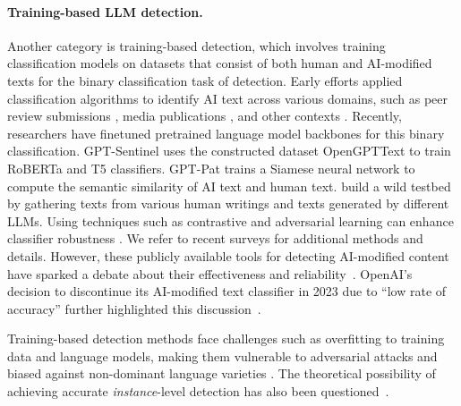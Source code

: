 \documentclass{article}
\begin{document}
\paragraph{Training-based LLM detection.} Another category is training-based detection, which involves training classification models on datasets that consist of both human and AI-modified texts for the binary classification task of detection. Early efforts applied classification algorithms to identify AI text across various domains, such as peer review submissions \citep{Bhagat2013SquibsWI}, media publications \citep{Zellers2019DefendingAN}, and other contexts \citep{Bakhtin2019RealOF, Uchendu2020AuthorshipAF}. Recently, researchers have finetuned pretrained language model backbones for this binary classification. GPT-Sentinel \citep{Chen2023GPTSentinelDH} uses the constructed dataset OpenGPTText to train RoBERTa \citep{Liu2019RoBERTaAR} and T5 \citep{raffel2020exploring} classifiers. GPT-Pat \citep{Yu2023GPTPT} trains a Siamese neural network to compute the semantic similarity of AI text and human text. \citet{Li2023DeepfakeTD} build a wild testbed by gathering texts from various human writings and texts generated by different LLMs. Using techniques such as contrastive and adversarial learning can enhance classifier robustness \citep{Liu2022CoCoCM, Bhattacharjee2023ConDACD, Hu2023RADARRA}. We refer to recent surveys \citet{Yang2023ASO, Ghosal2023TowardsP} for additional methods and details. However, these publicly available tools for detecting AI-modified content have sparked a debate about their effectiveness and reliability~\citep{OpenAIGPT2,jawahar2020automatic,fagni2021tweepfake,ippolito2019automatic,mitchell2023detectgpt,human-hard-to-detect-generated-text,mit-technology-review-how-to-spot-ai-generated-text,survey-2023, solaiman2019release}. OpenAI's decision to discontinue its AI-modified text classifier in 2023 due to ``low rate of accuracy'' further highlighted this discussion~\citep{Kirchner2023,Kelly2023}.

Training-based detection methods face challenges such as overfitting to training data and language models, making them vulnerable to adversarial attacks \citep{Wolff2020AttackingNT} and biased against non-dominant language varieties \citep{Liang2023GPTDA}. The theoretical possibility of achieving accurate \textit{instance}-level detection has also been questioned~\citep{Weber-Wulff2023,Sadasivan2023CanAT,chakraborty2023possibilities}. 
\end{document}
